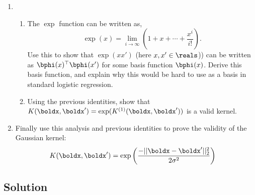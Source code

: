 \documentclass[submit]{harvardml}
\begin{document}
\begin{problem}
\begin{enumerate}
  [Hint: Use the property that for any
  $\bphi(\boldx)$,
  $K(\boldx, \boldx') = \bphi(\boldx)^\top\bphi(\boldx')$ forms a
  positive semi-definite kernel matrix. ]
  \item 
  \begin{enumerate}
  	\item The $\exp$ function can be written as,
  	$$\exp(x) = \lim_{i\rightarrow \infty} \left(1 + x + \cdots + \frac{x^i}{i!}\right).$$
  	  Use this to show that $\exp(xx')$ (here
          $x, x'\in \reals$)) can be written as $\bphi(x)^\top \bphi(x')$ for some basis function $\bphi(x)$. Derive this basis function,
          and explain why this  would be hard to use as a basis in standard logistic regression.
  	\item Using the previous identities, show that $K(\boldx, \boldx') = \exp( K^{(1)}(\boldx, \boldx'))$ is a valid kernel.
  	

  \end{enumerate}
  \item  Finally use this analysis and previous identities to prove the validity of the Gaussian kernel:
  \begin{align*}
	K(\boldx, \boldx') &= \exp \left( \frac{-||\boldx - \boldx'||^2_2}{2\sigma^2} \right) 
  \end{align*}
  \end{enumerate}



 \end{problem}
\subsection*{Solution}
\end{document}
